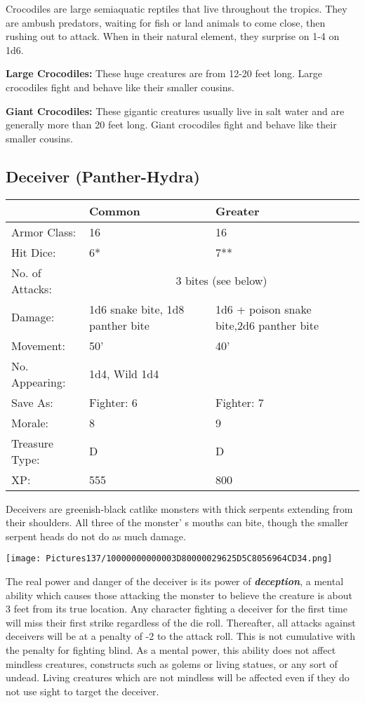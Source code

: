 \documentclass[a4paper,twoside,openany,10pt]{book}
\begin{document}
\begin{multicols}{2}
Crocodiles are large semiaquatic reptiles that live throughout the tropics. They are ambush predators, waiting for fish or land animals to come close, then rushing out to attack. When in their natural element, they surprise on 1-4 on 1d6.

\textbf{Large Crocodiles:} These huge creatures are from 12-20 feet long. Large crocodiles fight and behave like their smaller cousins.

\textbf{Giant Crocodiles:} These gigantic creatures usually live in salt water and are generally more than 20 feet long. Giant crocodiles fight and behave like their smaller cousins.

\subsection*{Deceiver (Panther-Hydra)}\label{deceiver-panther-hydra}

\begin{tabularx}{0.48\textwidth}{lXX}
& Common & Greater \\\hline
Armor Class: & 16 & 16 \\\hline
Hit Dice: & 6* & 7** \\\hline
No. of Attacks: &\multicolumn{2}{c}{3 bites (see below)} \\\hline
Damage: & 1d6 snake bite, 1d8 panther bite & 1d6 + poison snake bite,2d6 panther bite \\\hline
Movement: & 50' & 40' \\\hline
No. Appearing: & 1d4, Wild 1d4 & \\\hline
Save As: & Fighter: 6 & Fighter: 7 \\\hline
Morale: & 8 & 9 \\\hline
Treasure Type: & D & D \\\hline
XP: & 555 & 800 \\\hline
\end{tabularx}\medskip

Deceivers are greenish-black catlike monsters with thick serpents extending from their shoulders. All three of the monster' s mouths can bite, though the smaller serpent heads do not do as much damage.


\begin{center}
	\texttt{[image: Pictures137/10000000000003D80000029625D5C8056964CD34.png]}
\end{center}

The real power and danger of the deceiver is its power of \emph{\textbf{deception}}, a mental ability which causes those attacking the monster to believe the creature is about 3 feet from its true location. Any character fighting a deceiver for the first time will miss their first strike regardless of the die roll. Thereafter, all attacks against deceivers will be at a penalty of -2 to the attack roll. This is not cumulative with the penalty for fighting blind. As a mental power, this ability does not affect mindless creatures, constructs such as golems or living statues, or any sort of undead. Living creatures which are not mindless will be affected even if they do not use sight to target the deceiver.


\end{multicols}
\end{document}
